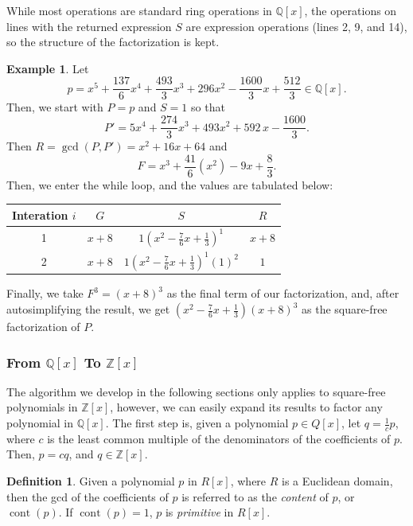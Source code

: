 \documentclass{article}
\theoremstyle{definition}
\newtheorem{defin}[thm]{Definition}
\newtheorem{exa}[thm]{Example}
\DeclareMathOperator{\cont}{cont}
\begin{document}
    While most operations are standard ring operations in $\mathbb{Q}[x]$, the operations on lines with the returned expression $S$ are expression operations (lines 2, 9, and 14), so the structure of the factorization is kept.
    
    \begin{exa}
        Let 
        \[ p = {x}^{5}+{\frac {137}{6}}{x}^{4}+{\frac {493}{3}}{x}^{3}+296{x}^{
2}-{\frac {1600}{3}}x+{\frac{512}{3}} \in \mathbb{Q}[x].\] 
Then, we start with $P = p$ and $S = 1$ so that 
\[ P' = 5{x}^{4}+{\frac {274}{3}}{x}^{3}+493{x}^{2}+592\,x-{\frac{1600}{
3}}.\] 
Then $R = \gcd(P, P') = x^2+16x+64$ and 
\[ F = x^3+\frac{41}{6}(x^2)-9x+\frac{8}{3}.\] 
Then, we enter the while loop, and the values are tabulated below:
\begingroup
\renewcommand*{\arraystretch}{2}
\begin{center}
    \begin{tabular}{c|c|c|c}
     Interation $i$ & $G$ & $S$ & $R$ \\
     \hline
     1 & $x+8$ & $1\left(x^2-\frac{7}{6}x+\frac{1}{3}\right)^1$ &  $x+8$ \\
     2 & $x+8$ & $1\left(x^2-\frac{7}{6}x+\frac{1}{3}\right)^1(1)^2$ & $1$ \\
    \end{tabular}
\end{center}
\endgroup

Finally, we take $F^3 = (x+8)^3$ as the final term of our factorization, and, after autosimplifying the result, we get $(x^2-\frac{7}{6}x+\frac{1}{3})(x+8)^3$ as the square-free factorization of $P$.
\end{exa}
    
    
    \subsubsection{From $\mathbb{Q}[x]$ To  $\mathbb{Z}[x]$}
    
    The algorithm we develop in the following sections only applies to square-free polynomials in $\mathbb{Z}[x]$, however, we can easily expand its results to factor any polynomial in $\mathbb{Q}[x]$. The first step is, given a polynomial $p \in Q[x]$, let $q = \frac{1}{c}p$, where $c$ is the least common multiple of the denominators of the coefficients of $p$. Then, $p = cq$, and $q \in \mathbb{Z}[x]$.
    
    \begin{defin}
        Given a polynomial $p$ in $R[x]$, where $R$ is a Euclidean domain, {\color{red} then} the gcd of the coefficients of $p$ is referred to as the \emph{content} of $p$, or $\cont(p)$. If $\cont(p) = 1$, $p$ is \emph{primitive} in $R[x]$. 
    \end{defin}
    
\end{document}
